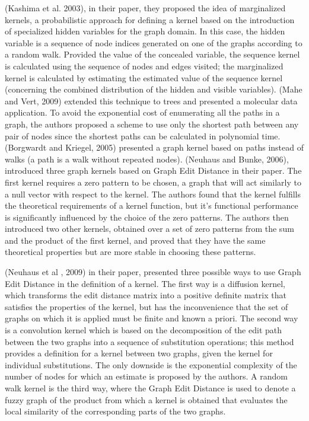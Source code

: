 (Kashima et al. 2003), in their paper, they proposed the idea of marginalized kernels, a probabilistic approach for defining a kernel based on the introduction of specialized hidden variables for the graph domain. In this case, the hidden variable is a sequence of node indices generated on one of the graphs according to a random walk. Provided the value of the concealed variable, the sequence kernel is calculated using the sequence of nodes and edges visited; the marginalized kernel is calculated by estimating the estimated value of the sequence kernel (concerning the combined distribution of the hidden and visible variables). (Mahe and Vert, 2009) extended this technique to trees and presented a molecular data application. To avoid the exponential cost of enumerating all the paths in a graph, the authors proposed a scheme to use only the shortest path between any pair of nodes since the shortest paths can be calculated in polynomial time. (Borgwardt and Kriegel, 2005) presented a graph kernel based on paths instead of walks (a path is a walk without repeated nodes). (Neuhaus and Bunke, 2006), introduced three graph kernels based on Graph Edit Distance in their paper. The first kernel requires a zero pattern to be chosen, a graph that will act similarly to a null vector with respect to the kernel. The authors found that the kernel fulfills the theoretical requirements of a kernel function, but it's functional performance is significantly influenced by the choice of the zero patterns. The authors then introduced two other kernels, obtained over a set of zero patterns from the sum and the product of the first kernel, and proved that they have the same theoretical properties but are more stable in choosing these patterns.

(Neuhaus et al , 2009) in their paper,  presented three possible ways to use Graph Edit Distance in the definition of a kernel. The first way is a diffusion kernel, which transforms the edit distance matrix into a positive definite matrix that satisfies the properties of the kernel, but has the inconvenience that the set of graphs on which it is applied must be finite and known a priori. The second way is a convolution kernel which is based on the decomposition of the edit path between the two graphs into a sequence of substitution operations; this method provides a definition for a kernel between two graphs, given the kernel for individual substitutions. The only downside is the exponential complexity of the number of nodes for which an estimate is proposed by the authors. A random walk kernel is the third way, where the Graph Edit Distance is used to denote a fuzzy graph of the product from which a kernel is obtained that evaluates the local similarity of the corresponding parts of the two graphs.

